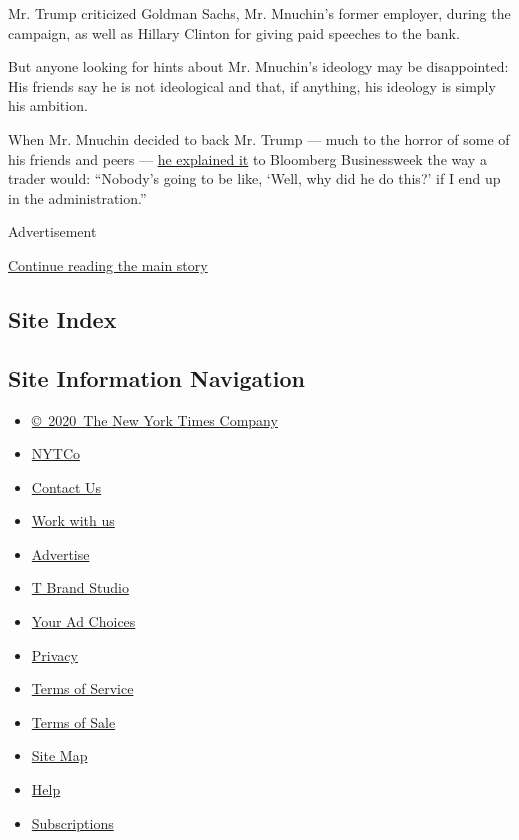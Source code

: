 Mr. Trump criticized Goldman Sachs, Mr. Mnuchin's former employer,
during the campaign, as well as Hillary Clinton for giving paid speeches
to the bank.

But anyone looking for hints about Mr. Mnuchin's ideology may be
disappointed: His friends say he is not ideological and that, if
anything, his ideology is simply his ambition.

When Mr. Mnuchin decided to back Mr. Trump --- much to the horror of
some of his friends and peers ---
\href{http://www.bloomberg.com/politics/articles/2016-08-31/steven-mnuchin-businessweek}{he
explained it} to Bloomberg Businessweek the way a trader would:
``Nobody's going to be like, `Well, why did he do this?' if I end up in
the administration.''

Advertisement

\protect\hyperlink{after-bottom}{Continue reading the main story}

\hypertarget{site-index}{%
\subsection{Site Index}\label{site-index}}

\hypertarget{site-information-navigation}{%
\subsection{Site Information
Navigation}\label{site-information-navigation}}

\begin{itemize}
\tightlist
\item
  \href{https://help.nytimes.com/hc/en-us/articles/115014792127-Copyright-notice}{©~2020~The
  New York Times Company}
\end{itemize}

\begin{itemize}
\tightlist
\item
  \href{https://www.nytco.com/}{NYTCo}
\item
  \href{https://help.nytimes.com/hc/en-us/articles/115015385887-Contact-Us}{Contact
  Us}
\item
  \href{https://www.nytco.com/careers/}{Work with us}
\item
  \href{https://nytmediakit.com/}{Advertise}
\item
  \href{http://www.tbrandstudio.com/}{T Brand Studio}
\item
  \href{https://www.nytimes.com/privacy/cookie-policy\#how-do-i-manage-trackers}{Your
  Ad Choices}
\item
  \href{https://www.nytimes.com/privacy}{Privacy}
\item
  \href{https://help.nytimes.com/hc/en-us/articles/115014893428-Terms-of-service}{Terms
  of Service}
\item
  \href{https://help.nytimes.com/hc/en-us/articles/115014893968-Terms-of-sale}{Terms
  of Sale}
\item
  \href{https://spiderbites.nytimes.com}{Site Map}
\item
  \href{https://help.nytimes.com/hc/en-us}{Help}
\item
  \href{https://www.nytimes.com/subscription?campaignId=37WXW}{Subscriptions}
\end{itemize}
